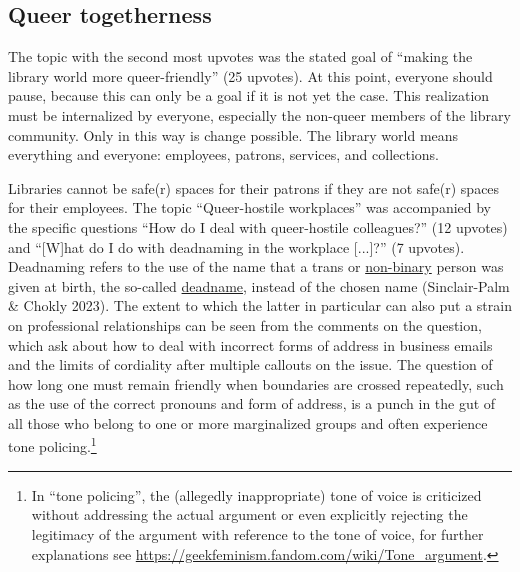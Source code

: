 \documentclass[a4paper,
fontsize=11pt,
oneside,
numbers=noperiodatend,
parskip=half-,
bibliography=totoc,
final
]{scrartcl}
\begin{document}
\hypertarget{queer-togetherness}{%
\subsection{Queer togetherness}\label{queer-togetherness}}

The topic with the second most upvotes was the stated goal of \enquote{making
the library world more queer-friendly} (25 upvotes). At this point,
everyone should pause, because this can only be a goal if it is not yet
the case. This realization must be internalized by everyone, especially
the non-queer members of the library community. Only in this way is
change possible. The library world means everything and everyone:
employees, patrons, services, and collections.

Libraries cannot be safe(r) spaces for their patrons if they are not
safe(r) spaces for their employees. The topic \enquote{Queer-hostile workplaces}
was accompanied by the specific questions \enquote{How do I deal with
queer-hostile colleagues?} (12 upvotes) and \enquote{{[}W{]}hat do I do with
deadnaming in the workplace {[}...{]}?} (7 upvotes). Deadnaming refers
to the use of the name that a trans or
\href{https://lgbtqia.fandom.com/wiki/Gender_identity\#Non-binary}{non-binary}
person was given at birth, the so-called
\href{https://www.merriam-webster.com/dictionary/deadname}{deadname},
instead of the chosen name (Sinclair-Palm \& Chokly 2023). The extent to
which the latter in particular can also put a strain on professional
relationships can be seen from the comments on the question, which ask
about how to deal with incorrect forms of address in business emails and
the limits of cordiality after multiple callouts on the issue. The
question of how long one must remain friendly when boundaries are
crossed repeatedly, such as the use of the correct pronouns and form of
address, is a punch in the gut of all those who belong to one or more
marginalized groups and often experience tone policing.\footnote{In
  \enquote{tone policing}, the (allegedly inappropriate) tone of voice is
  criticized without addressing the actual argument or even explicitly
  rejecting the legitimacy of the argument with reference to the tone of
  voice, for further explanations see
  \url{https://geekfeminism.fandom.com/wiki/Tone_argument}.}
\end{document}
